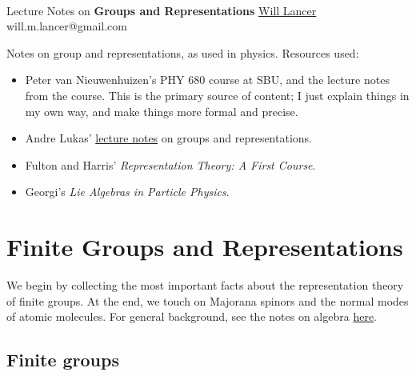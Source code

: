 \documentclass[11pt]{article}
\begin{document}
\thispagestyle{empty}
\bigskip \
\vspace{0.1cm}

\begin{center}
{\fontsize{22}{22} \selectfont Lecture Notes on}
\vskip 16pt
{\fontsize{36}{36} \selectfont \bf \sffamily Groups and Representations}
\vskip 24pt
{\fontsize{18}{18} \selectfont \rmfamily \href{https://will-lancer.github.io}{Will Lancer}} 
\vskip 6pt
{\fontsize{14}{14} \selectfont \ttfamily will.m.lancer@gmail.com} 
\vskip 24pt
\end{center}

{\parindent0pt \baselineskip=15.5pt}
\noin
Notes on group and representations, as used in physics. Resources used:
\begin{itemize}
    \item Peter van Nieuwenhuizen's PHY 680 course at SBU,
    and the lecture notes from the course. This is the primary
    source of content; I just explain things in my own way, and
    make things more formal and precise.
    \item Andre Lukas' 
    \href{https://www-thphys.physics.ox.ac.uk/people/AndreLukas/GroupsandRepresentations/groupsrepslecturenotes.pdf}{lecture notes} 
    on groups and representations.
    \item Fulton and Harris' \emph{Representation Theory: A First Course}.
    \item Georgi's \emph{Lie Algebras in Particle Physics}.
\end{itemize}

\newpage
\microtoc
\newpage


\section{Finite Groups and Representations}

We begin by collecting the most important facts about the representation
theory of finite groups. At the end, we touch on Majorana spinors and the normal
modes of atomic molecules. For general background, see the notes on
algebra \href{https://github.com/will-lancer/notes/blob/main/Mathematics/Algebra/Algebra.pdf}{here}.

\subsection{Finite groups}
\end{document}
